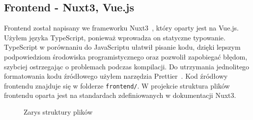 \documentclass[shortabstract]{iithesis}
\begin{document}
\subsection{Frontend - Nuxt3, Vue.js}
Frontend został napisany we frameworku Nuxt3~\cite{Nuxt3}, który oparty jest na Vue.js.
Użyłem języka TypeScript, ponieważ wprowadza on statyczne typowanie.
TypeScript w porównaniu do JavaScriptu ułatwił pisanie kodu, dzięki lepszym podpowiedziom środowiska programistycznego oraz pozwolił zapobiegać błędom, szybciej ostrzegając o problemach podczas kompilacji.
Do utrzymania jednolitego formatowania kodu źródłowego użyłem narzędzia Prettier~\cite{Prettier}.
Kod źródłowy frontendu znajduje się w folderze \texttt{frontend/}. W projekcie struktura plików frontendu oparta jest na
standardach zdefiniowanych w dokumentacji Nuxt3.
\begin{figure}[H]
    \caption{Zarys struktury plików}
\end{figure}
\end{document}

